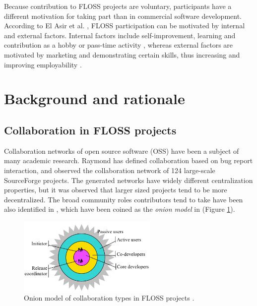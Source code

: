 Because contribution to FLOSS projects are voluntary, participants have a different motivation for taking part than in commercial software development. According to El Asir et al. \cite{elasriPeripheryCoreTemporal2017}, FLOSS participation can be motivated by internal and external factors. Internal factors include self-improvement, learning and contribution as a hobby or pass-time activity  \cite{alexanderharsWorkingFreeMotivations2002,yunwenyeUnderstandingMotivationOpen2003}, whereas external factors are motivated by marketing and demonstrating certain skills, thus increasing and improving employability \cite{alexanderharsWorkingFreeMotivations2002}. \\

\section{Background and rationale}

\subsection{Collaboration in FLOSS projects}
Collaboration networks of open source software (OSS) have been a subject of many academic research. Raymond \cite{crowstonSocialStructureFree2005} has defined collaboration based on bug report interaction, and observed the collaboration network of 124 large-scale SourceForge projects. The generated networks have widely different centralization properties, but it was observed that larger sized projects tend to be more decentralized. The broad community roles contributors tend to take have been also identified in \cite{crowstonSocialStructureFree2005}, which have been coined as the \textit{onion model} in \cite{martinez-romoUsingSocialNetwork2008} (Figure \ref{fig:onion1}). \\

\begin{figure}
    \centering
    \includegraphics[width=0.6\textwidth]{figures/onion_model.png}
    \caption{Onion model of collaboration types in FLOSS projects \cite{crowstonSocialStructureFree2005}.}
    \label{fig:onion1}
\end{figure}

